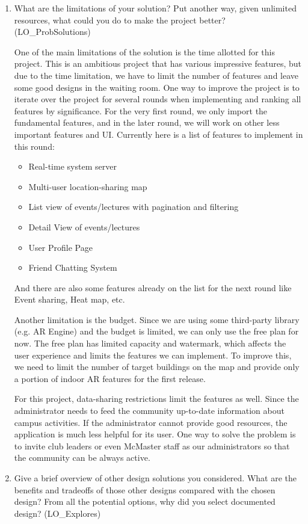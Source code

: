 \documentclass[12pt, titlepage]{article}
\begin{document}
\begin{enumerate}
  \item What are the limitations of your solution?  Put another way, given
  unlimited resources, what could you do to make the project better? (LO\_ProbSolutions)
  
	One of the main limitations of the solution is the time allotted for this project. This is an ambitious project that has various impressive features, but due to the time limitation, we have to limit the number of features and leave some good designs in the waiting room. One way to improve the project is to iterate over the project for several rounds when implementing and ranking all features by significance. For the very first round, we only import the fundamental features, and in the later round, we will work on other less important features and UI. Currently here is a list of features to implement in this round:
	\begin{itemize}
	\item Real-time system server
	\item Multi-user location-sharing map
	\item List view of events/lectures with pagination and filtering
	\item Detail View of events/lectures
	\item User Profile Page
	\item Friend Chatting System
	\end{itemize}
 And there are also some features already on the list for the next round
 like Event sharing, Heat map, etc.
 
 	Another limitation is the budget. Since we are using some third-party library (e.g. AR Engine) and the budget is limited, we can only use the free plan for now. The free plan has limited capacity and watermark, which affects the user experience and limits the features we can implement. To improve this, we need to limit the number of target buildings on the map and provide only a portion of indoor AR features for the first release.
 	
 	For this project, data-sharing restrictions limit the features as well. Since the administrator needs to feed the community up-to-date information about campus activities. If the administrator cannot provide good resources, the application is much less helpful for its user. One way to solve the problem is to invite club leaders or even McMaster staff as our administrators so that the community can be always active.
  \item Give a brief overview of other design solutions you considered.  What
  are the benefits and tradeoffs of those other designs compared with the chosen
  design?  From all the potential options, why did you select documented design?
  (LO\_Explores)
  

\end{enumerate}
\end{document}
